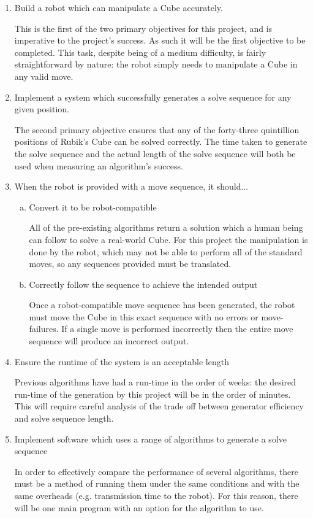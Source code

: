 \documentclass{report}
\begin{document}
    \begin{enumerate}
    	\item Build a robot which can manipulate a Cube accurately. \par This is the first of the two primary objectives for this project, and is imperative to the project's success. As such it will be the first objective to be completed. This task, despite being of a medium difficulty, is fairly straightforward by nature: the robot simply needs to manipulate a Cube in any valid move.
    	\item Implement a system which successfully generates a solve sequence for any given position. \par The second primary objective ensures that any of the forty-three quintillion positions of Rubik's Cube can be solved correctly. The time taken to generate the solve sequence and the actual length of the solve sequence will both be used when measuring an algorithm's success.
    	\item When the robot is provided with a move sequence, it should...
    	\begin{enumerate}[a)]
    		\item Convert it to be robot-compatible \par All of the pre-existing algorithms return a solution which a human being can follow to solve a real-world Cube. For this project the manipulation is done by the robot, which may not be able to perform all of the standard moves, so any sequences provided must be translated.
    		\item Correctly follow the sequence to achieve the intended output \par Once a robot-compatible move sequence has been generated, the robot must move the Cube in this exact sequence with no errors or move-failures. If a single move is performed incorrectly then the entire move sequence will produce an incorrect output.
    	\end{enumerate}
    	\item Ensure the runtime of the system is an acceptable length \par Previous algorithms have had a run-time in the order of weeks: the desired run-time of the generation by this project will be in the order of minutes. This will require careful analysis of the trade off between generator efficiency and solve sequence length.
    	\item Implement software which uses a range of algorithms to generate a solve sequence \par In order to effectively compare the performance of several algorithms, there must be a method of running them under the same conditions and with the same overheads (e.g. transmission time to the robot). For this reason, there will be one main program with an option for the algorithm to use.

\end{enumerate}
\end{document}
